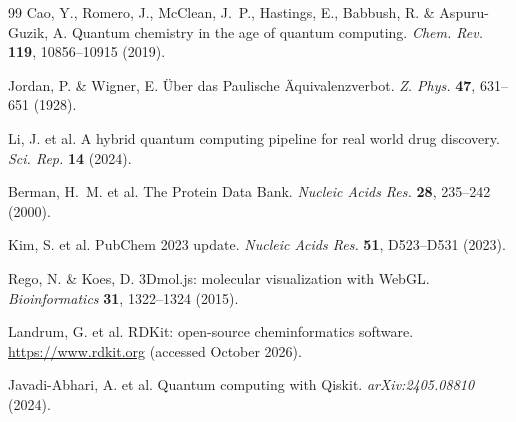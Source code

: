 \documentclass[10pt,a4paper,twocolumn]{article}
\begin{document}
\begin{thebibliography}{99}
 Cao, Y., Romero, J., McClean, J.~P., Hastings, E., Babbush, R. \&
Aspuru-Guzik, A. Quantum chemistry in the age of quantum computing. \emph{Chem. Rev.}
\textbf{119}, 10856--10915 (2019).

 Jordan, P. \& Wigner, E. \"Uber das Paulische
\"Aquivalenzverbot. \emph{Z. Phys.} \textbf{47}, 631--651 (1928).

 Li, J. et al. A hybrid quantum computing pipeline for real world drug
discovery. \emph{Sci. Rep.} \textbf{14} (2024).

 Berman, H.~M. et al. The Protein Data Bank. \emph{Nucleic Acids
Res.} \textbf{28}, 235--242 (2000).

 Kim, S. et al. PubChem 2023 update. \emph{Nucleic Acids Res.}
\textbf{51}, D523--D531 (2023).

 Rego, N. \& Koes, D. 3Dmol.js: molecular visualization with WebGL.
\emph{Bioinformatics} \textbf{31}, 1322--1324 (2015).

 Landrum, G. et al. RDKit: open-source cheminformatics software.
\url{https://www.rdkit.org} (accessed October 2026).

 Javadi-Abhari, A. et al. Quantum computing with Qiskit.
\emph{arXiv:2405.08810} (2024).

\end{thebibliography}
\end{document}
